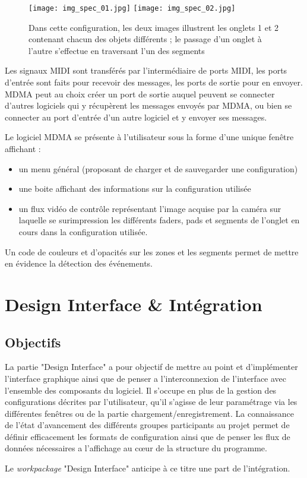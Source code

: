 \begin{figure}[h]
    \centering
    \texttt{[image: img\_spec\_01.jpg]} \texttt{[image: img\_spec\_02.jpg]}
    \caption{Dans cette configuration, les deux images illustrent les onglets 1 et 2 contenant chacun des objets différents ; le passage d'un onglet à l'autre s'effectue en traversant l'un des segments}
    \label{chgt_onglet}
\end{figure}
\par Les signaux MIDI sont transférés par l'intermédiaire de ports MIDI, les ports d'entrée sont faits pour recevoir des messages, les ports de sortie pour en envoyer. MDMA peut au choix créer un port de sortie auquel peuvent se connecter d'autres logiciels qui y récupèrent les messages envoyés par MDMA, ou bien se connecter au port d'entrée d'un autre logiciel et y envoyer ses messages.
\par Le logiciel MDMA se présente à l'utilisateur sous la forme d'une unique fenêtre affichant :
\begin{itemize}
    \item un menu général (proposant de charger et de sauvegarder une configuration)
    \item une boite affichant des informations sur la configuration utilisée
    \item un flux vidéo de contrôle représentant l'image acquise par la caméra sur laquelle se surimpression les différents faders, pads et segments de l'onglet en cours dans la configuration utilisée.
\end{itemize}
Un code de couleurs et d'opacités sur les zones et les segments permet de mettre en évidence la détection des événements.
\section{Design Interface \& Intégration}
\subsection{Objectifs}
\par La partie "Design Interface" a pour objectif de mettre au point et d'implémenter l'interface graphique ainsi que de penser a l'interconnexion de l'interface avec l'ensemble des composants du logiciel. Il s'occupe en plus de la gestion des configurations décrites par l'utilisateur, qu'il s'agisse de leur paramétrage via les différentes fenêtres ou de la partie chargement/enregistrement. La connaissance de l'état d'avancement des différents groupes participants au projet permet de définir efficacement les formats de configuration ainsi que de penser les flux de données nécessaires a l'affichage au cœur de la structure du programme.
\par Le \emph{workpackage} "Design Interface" anticipe à ce titre une part de l'intégration.
